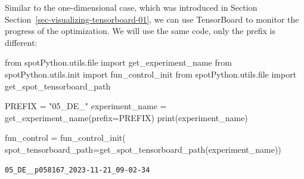 \documentclass[
  letterpaper,
  DIV=11,
  numbers=noendperiod]{scrreprt}
\newenvironment{Shaded}{\begin{snugshade}}{\end{snugshade}}
\newcommand{\BuiltInTok}[1]{\textcolor[rgb]{0.00,0.23,0.31}{#1}}
\newcommand{\ImportTok}[1]{\textcolor[rgb]{0.00,0.46,0.62}{#1}}
\newcommand{\NormalTok}[1]{\textcolor[rgb]{0.00,0.23,0.31}{#1}}
\newcommand{\OperatorTok}[1]{\textcolor[rgb]{0.37,0.37,0.37}{#1}}
\newcommand{\StringTok}[1]{\textcolor[rgb]{0.13,0.47,0.30}{#1}}
\begin{document}
\begin{tcolorbox}[enhanced jigsaw, rightrule=.15mm, opacityback=0, colframe=quarto-callout-note-color-frame, opacitybacktitle=0.6, toptitle=1mm, arc=.35mm, colbacktitle=quarto-callout-note-color!10!white, coltitle=black, toprule=.15mm, leftrule=.75mm, titlerule=0mm, title=\textcolor{quarto-callout-note-color}{\faInfo}\hspace{0.5em}{TensorBoard}, bottomrule=.15mm, breakable, bottomtitle=1mm, left=2mm, colback=white]

Similar to the one-dimensional case, which was introduced in Section
Section~\ref{sec-visualizing-tensorboard-01}, we can use TensorBoard to
monitor the progress of the optimization. We will use the same code,
only the prefix is different:

\begin{Shaded}
\begin{Highlighting}[]
\ImportTok{from}\NormalTok{ spotPython.utils.}\BuiltInTok{file} \ImportTok{import}\NormalTok{ get\_experiment\_name}
\ImportTok{from}\NormalTok{ spotPython.utils.init }\ImportTok{import}\NormalTok{ fun\_control\_init}
\ImportTok{from}\NormalTok{ spotPython.utils.}\BuiltInTok{file} \ImportTok{import}\NormalTok{ get\_spot\_tensorboard\_path}

\NormalTok{PREFIX }\OperatorTok{=} \StringTok{"05\_DE\_"}
\NormalTok{experiment\_name }\OperatorTok{=}\NormalTok{ get\_experiment\_name(prefix}\OperatorTok{=}\NormalTok{PREFIX)}
\BuiltInTok{print}\NormalTok{(experiment\_name)}

\NormalTok{fun\_control }\OperatorTok{=}\NormalTok{ fun\_control\_init(}
\NormalTok{    spot\_tensorboard\_path}\OperatorTok{=}\NormalTok{get\_spot\_tensorboard\_path(experiment\_name))}
\end{Highlighting}
\end{Shaded}

\begin{verbatim}
05_DE__p058167_2023-11-21_09-02-34
\end{verbatim}

\end{tcolorbox}
\end{document}
